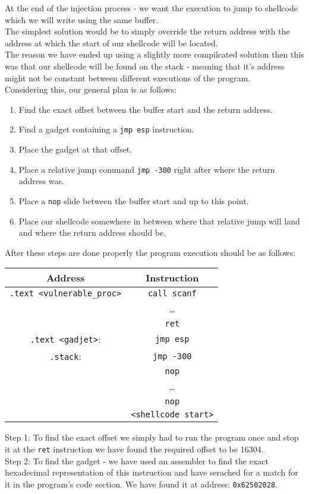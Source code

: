\documentclass{article}
\begin{document}
At the end of the injection process - we want
the execution to jump to shellcode which we will write using the same buffer.\\
The simplest solution would be to simply override the return address
with the address at which the start of our shellcode will be located.\\
The reason we have ended up using a slightly more compilcated solution then
this was that our shellcode will be found on the stack - meaning that
it's address might not be constant between different executions of the program.\\

Considering this, our general plan is as follows:
\begin{enumerate}
    \item Find the exact offset between the buffer start and the return address.
    \item Find a gadget containing a \texttt{jmp esp} instruction.
    \item Place the gadget at that offset.
    \item Place a relative jump command \texttt{jmp -300} right after where the return address was.
    \item Place a \texttt{nop} slide between the buffer start and up to this point.
    \item Place our shellcode somewhere in between where that relative jump will land and
        where the return address should be.
\end{enumerate}
After these steps are done properly 
the program execution should be as follows:
\begin{center}
    \begin{tabular}{|c|c|}
        \hline
        \textbf{Address} & \textbf{Instruction}\\
        \hline
        \texttt{.text <vulnerable\_proc>} & \texttt{call scanf}\\
        & \dots\\
        & \texttt{ret}\\
        \hline
        \texttt{.text <gadjet>}: & \texttt{jmp esp}\\
        \hline
        \texttt{.stack}: & \texttt{jmp -300}\\
        & \texttt{nop}\\
        & \dots\\
        & \texttt{nop}\\
        & \texttt{<shellcode start>}\\
        \hline
    \end{tabular}
\end{center}
Step 1: To find the exact offset we simply had to run the program once and
stop it at the \texttt{ret} instruction we have found the required offset to be 16304.\\
Step 2: To find the gadget - we have used an assembler to find the exact hexadecimal representation
of this instruction and have serached for a match for it in the program's code section.
We have found it at address: \texttt{0x62502028}.\\
\end{document}

